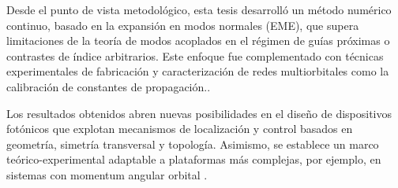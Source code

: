 Desde el punto de vista metodológico, esta tesis desarrolló un método numérico continuo, basado en la expansión en modos normales (EME), que supera limitaciones de la teoría de modos acoplados en el régimen de guías próximas o contrastes de índice arbitrarios. Este enfoque fue complementado con técnicas experimentales de fabricación y caracterización de redes multiorbitales como la calibración de constantes de propagación..

Los resultados obtenidos abren nuevas posibilidades en el diseño de dispositivos fotónicos que explotan mecanismos de localización y control basados en geometría, simetría transversal y topología. Asimismo, se establece un marco teórico-experimental adaptable a plataformas más complejas, por ejemplo, en sistemas con momentum angular orbital \citep{OAMCaging}.

